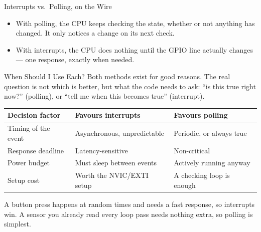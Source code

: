\documentclass[9pt,aspectratio=169,xcolor=table]{beamer}
\begin{document}
\begin{frame}{Interrupts vs.\ Polling, on the Wire}
\begin{center}
{}
    \end{center}

    {\footnotesize \begin{itemize}
    		\item With
    		polling, the CPU keeps checking the state, whether or not anything
    		has changed. It only notices a change on its next check.
    		\item With interrupts, the CPU does nothing until the GPIO line
    		actually changes --- \alert{one} response, exactly when needed.
    	\end{itemize} }
\end{frame}

\begin{frame}{When Should I Use Each?}
	\leavevmode
	{\small Both methods exist for good reasons. The real question is not
		\alert{which is better}, but \alert{what the code needs to ask}: ``is
		this true right now?'' (polling), or ``tell me when this becomes
		true'' (interrupt).}

	\begin{center}
		{\small
			\striped
			\begin{tabular}{@{}l l l@{}}
				\toprule
				\textbf{Decision factor} & \textbf{Favours interrupts} & \textbf{Favours polling} \\
				\midrule
				Timing of the event & Asynchronous, unpredictable & Periodic, or always true \\
				Response deadline & Latency-sensitive & Non-critical \\
				Power budget & Must sleep between events & Actively running anyway \\
				Setup cost & Worth the NVIC/EXTI setup & A checking loop is enough \\
				\bottomrule
		\end{tabular}}
	\end{center}

	{\small A button press happens at random times and needs a fast
		response, so \alert{interrupts win}. A sensor you already read every
		loop pass needs nothing extra, so \alert{polling is simplest}.}
\end{frame}
\end{document}
